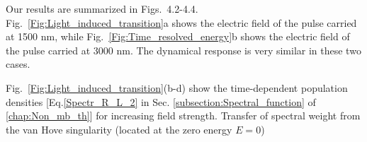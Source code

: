 
Our results are summarized in Figs.~4.2-4.4. 
Fig.~\ref{Fig:Light_induced_transition}a shows the electric field of the 
pulse carried at 1500 nm, while Fig.~\ref{Fig:Time_resolved_energy}b shows
the electric field of the pulse carried at 
3000 nm. The dynamical response is very similar in
these two cases.

Fig.~\ref{Fig:Light_induced_transition}(b-d) show the time-dependent population
densities [Eq.\eqref{Spectr_R_L_2} in Sec. \ref{subsection:Spectral_function} of \autoref{chap:Non_mb_th}] for increasing field
strength.  
Transfer of spectral weight from the van Hove singularity 
(located at the zero energy $E=0$) 
